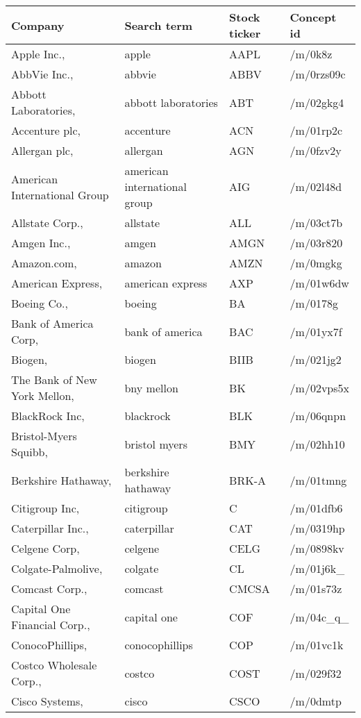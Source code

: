 \begin{longtable}[c]{llll}
\label{app:company_terms} 
\textbf{Company} & \textbf{Search term} & \textbf{Stock ticker} & \textbf{Concept id} \\
\endhead
%
Apple Inc., & apple & AAPL & /m/0k8z \\
AbbVie Inc., & abbvie & ABBV & /m/0rzs09c \\
Abbott Laboratories, & abbott laboratories & ABT & /m/02gkg4 \\
Accenture plc, & accenture & ACN & /m/01rp2c \\
Allergan plc, & allergan & AGN & /m/0fzv2y \\
American International Group& american international group & AIG & /m/02l48d \\
Allstate Corp., & allstate & ALL & /m/03ct7b \\
Amgen Inc., & amgen & AMGN & /m/03r820 \\
Amazon.com, & amazon & AMZN & /m/0mgkg \\
American Express, & american express & AXP & /m/01w6dw \\
Boeing Co., & boeing & BA & /m/0178g \\
Bank of America Corp, & bank of america & BAC & /m/01yx7f \\
Biogen, & biogen & BIIB & /m/021jg2 \\
The Bank of New York Mellon, & bny mellon & BK & /m/02vps5x \\
BlackRock Inc, & blackrock & BLK & /m/06qnpn \\
Bristol-Myers Squibb, & bristol myers & BMY & /m/02hh10 \\
Berkshire Hathaway, & berkshire hathaway & BRK-A & /m/01tmng \\
Citigroup Inc, & citigroup & C & /m/01dfb6 \\
Caterpillar Inc., & caterpillar & CAT & /m/0319hp \\
Celgene Corp, & celgene & CELG & /m/0898kv \\
Colgate-Palmolive, & colgate & CL & /m/01j6k\_ \\
Comcast Corp., & comcast & CMCSA & /m/01s73z \\
Capital One Financial Corp., & capital one & COF & /m/04c\_q\_ \\
ConocoPhillips, & conocophillips & COP & /m/01vc1k \\
Costco Wholesale Corp., & costco & COST & /m/029f32 \\
Cisco Systems, & cisco & CSCO & /m/0dmtp \\

\end{longtable}
